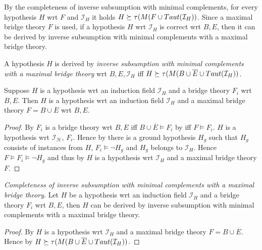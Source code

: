 By the completeness of inverse subsumption with minimal complements, for every hypothesis $H$ wrt $F$ and $\mathcal{I}_H$ it holds $H \succeq \tau(M(F \cup Taut(\mathcal{I}_H))$. Since a maximal bridge theory $F$ is used, if a hypothesis $H$ wrt $\mathcal{I}_H$ is correct wrt $B, E$, then it can be derived by inverse subsumption with minimal complements with a maximal bridge theory.

\begin{defn}
A hypothesis $H$ is derived by \emph{inverse subsumption with minimal complements with a maximal bridge theory} wrt $B, E, \mathcal{I}_H$ iff
$H \succeq \tau(M(B \cup \overline{E} \cup Taut(\mathcal{I}_H))$.
\end{defn}

\begin{lemma}\label{lemma_hypothesis_wrt_bridge_theory_correspondence}
Suppose $H$ is a hypothesis wrt an induction field $\mathcal{I}_H$ and a bridge theory $F_i$ wrt $B, E$. Then $H$ is a hypothesis wrt an induction field $\mathcal{I}_H$ and a maximal bridge theory $F=B \cup \overline{E}$ wrt $B, E$.
\end{lemma}
\begin{proof}
By  $F_i$ is a bridge theory wrt $B, E$ iff $B \cup \overline{E} \models F_i$ by  iff $F \models F_i$.
$H$ is a hypothesis wrt $\mathcal{I_H}$, $F_i$. Hence by  there is a ground hypothesis $H_g$ such that $H_g$ consists of instances from $H$,
$F_i \models \neg H_g$ and $H_g$ belongs to $\mathcal{I}_H$. Hence $F \models F_i \models \neg H_g$ and thus by  $H$ is a hypothesis wrt $\mathcal{I}_H$ and a maximal bridge theory $F$.
\end{proof}

\begin{proposition}
\label{completeness_of_inverse_subsumption_with_maximal_bridge_theory}
\emph{Completeness of inverse subsumption with minimal complements with a maximal bridge theory}.
Let $H$ be a hypothesis wrt an induction field $\mathcal{I}_H$ and a bridge theory $F_i$ wrt $B, E$, then $H$ can be derived by inverse subsumption with minimal complements with a maximal bridge theory.
\end{proposition}

\begin{proof}
By  $H$ is a hypothesis wrt $\mathcal{I}_H$ and a maximal bridge theory $F=B \cup \overline{E}$.
Hence by  $H \succeq \tau(M(B \cup \overline{E} \cup Taut(\mathcal{I}_H))$.
\end{proof}

